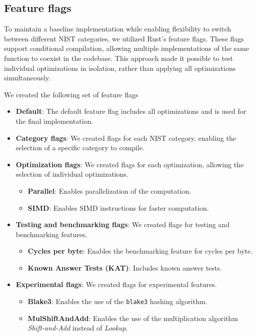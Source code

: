 \documentclass[11pt]{report}
\theoremstyle{definition}
\theoremstyle{plain}
\begin{document}
\subsection{Feature flags}\label{sub:feature_flags}
To maintain a baseline implementation while enabling flexibility to switch between different NIST categories, we utilized Rust's feature flags. These flags support conditional compilation, allowing multiple implementations of the same function to coexist in the codebase. This approach made it possible to test individual optimizations in isolation, rather than applying all optimizations simultaneously.

We created the following set of feature flags

\begin{itemize}[parsep=0pt, itemsep=3pt]
  \item \textbf{Default}: The default feature flag includes all optimizations and is used for the final implementation.
  \item \textbf{Category flags}: We created flags for each NIST category, enabling the selection of a specific category to compile.
  \item \textbf{Optimization flags}: We created flags for each optimization, allowing the selection of individual optimizations.
        \begin{itemize}
          \item \textbf{Parallel}: Enables parallelization of the computation.
          \item \textbf{SIMD}: Enables SIMD instructions for faster computation.
        \end{itemize}
  \item \textbf{Testing and benchmarking flags}: We created flags for testing and benchmarking features.
        \begin{itemize}
          \item \textbf{Cycles per byte}: Enables the benchmarking feature for cycles per byte.
          \item \textbf{Known Answer Tests (KAT)}: Includes known answer tests.
        \end{itemize}
  \item \textbf{Experimental flags}: We created flags for experimental features.
        \begin{itemize}
          \item \textbf{Blake3}: Enables the use of the \texttt{blake3} hashing algorithm.
          \item \textbf{MulShiftAndAdd}: Enables the use of the multiplication algorithm \textit{Shift-and-Add} instead of \textit{Lookup}.
        \end{itemize}
\end{itemize}
\end{document}
